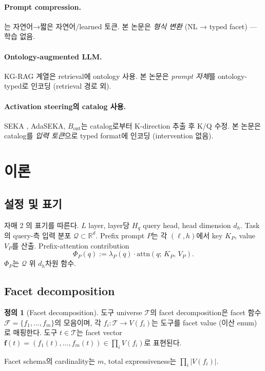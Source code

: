 \documentclass[11pt]{article}
\theoremstyle{plain}
\theoremstyle{definition}
\newtheorem{definition}[theorem]{정의}
\theoremstyle{remark}
\newcommand{\R}{\mathbb{R}}
\newcommand{\dh}{d_{\!h}}
\newcommand{\Hq}{H_{\!q}}
\newcommand{\attn}{\mathrm{attn}}
\newcommand{\Phip}{\Phi_P}
\begin{document}
\paragraph{Prompt compression.}
\citet{jiang2023llmlingua, mu2023gist, li2024compressor}는 자연어→짧은 자연어/learned 토큰. 본 논문은 \emph{형식 변환} (NL → typed facet) — 학습 없음.

\paragraph{Ontology-augmented LLM.}
KG-RAG 계열은 retrieval에 ontology 사용. 본 논문은 \emph{prompt 자체}를 ontology-typed로 인코딩 (retrieval 경로 외).

\paragraph{Activation steering의 catalog 사용.}
SEKA \citep{lee2025seka}, AdaSEKA, $B_{\mathrm{ont}}$는 catalog로부터 K-direction 추출 후 K/Q 수정. 본 논문은 catalog를 \emph{입력 토큰}으로 typed format에 인코딩 (intervention 없음).

\section{이론}
\label{sec:theory}

\subsection{설정 및 표기}
자매 2 \citep{sibling2027prompt}의 표기를 따른다. $L$ layer, layer당 $\Hq$ query head, head dimension $\dh$. Task의 query-측 입력 분포 $\mathcal{Q} \subset \R^d$. Prefix prompt $P$는 각 $(\ell, h)$에서 key $K_P$, value $V_P$를 산출. Prefix-attention contribution
\[
  \Phip(q) := \lambda_P(q)\cdot \attn(q;\, K_P,\, V_P).
\]
$\Phip$는 $\mathcal{Q}$ 위 $\dh$차원 함수.

\subsection{Facet decomposition}
\label{sec:facet-def}

\begin{definition}[Facet decomposition]
\label{def:facet-decomp}
도구 universe $\mathcal{T}$의 facet decomposition은 facet 함수 $\mathcal{F} = \{f_1, \ldots, f_m\}$의 모음이며, 각 $f_i: \mathcal{T} \to V(f_i)$는 도구를 facet value (이산 enum)로 매핑한다. 도구 $t \in \mathcal{T}$는 facet vector $\mathbf{f}(t) = (f_1(t), \ldots, f_m(t)) \in \prod_i V(f_i)$로 표현된다.

Facet schema의 cardinality는 $m$, total expressiveness는 $\prod_i |V(f_i)|$.
\end{definition}
\end{document}
